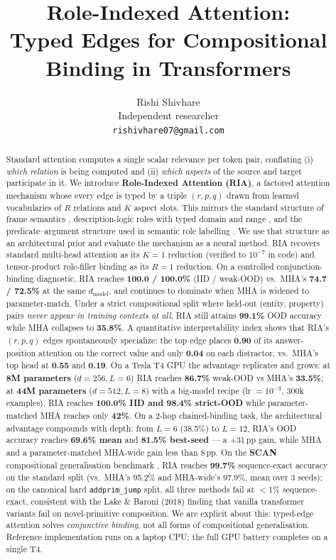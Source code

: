 \documentclass{article}
\title{Role-Indexed Attention:\\
Typed Edges for Compositional Binding in Transformers}
\author{%
  Rishi Shivhare\\
  Independent researcher\\
  \texttt{rishivhare07@gmail.com}
}
\date{}
\begin{document}
\maketitle

\begin{abstract}
Standard attention computes a single scalar relevance per token pair,
conflating (i) \emph{which relation} is being computed and (ii)
\emph{which aspects} of the source and target participate in it. We
introduce \textbf{Role-Indexed Attention (RIA)}, a factored attention
mechanism whose every edge is typed by a triple $(r, p, q)$ drawn
from learned vocabularies of $R$ relations and $K$ aspect slots. This
mirrors the standard structure of frame semantics
\citep{fillmore1976,baker1998framenet}, description-logic roles with
typed domain and range \citep{baader2003description}, and the
predicate--argument structure used in semantic role labelling
\citep{palmer2005propbank}. We use that structure as an architectural
prior and evaluate the mechanism as a neural method.
%
RIA recovers standard multi-head attention as its $K{=}1$ reduction
(verified to $10^{-7}$ in code) and tensor-product role-filler binding
as its $R{=}1$ reduction. On a controlled conjunction-binding
diagnostic, RIA reaches \textbf{100.0 / 100.0\%} (IID / weak-OOD)
vs.\ MHA's \textbf{74.7 / 72.5\%} at the same $d_{\text{model}}$, and
continues to dominate when MHA is widened to parameter-match.  Under a
strict compositional split where held-out (entity, property) pairs
\emph{never appear in training contexts at all}, RIA still attains
\textbf{99.1\%} OOD accuracy while MHA collapses to
\textbf{35.8\%}. A quantitative interpretability index
shows that RIA's $(r, p, q)$ edges spontaneously specialize: the top
edge places \textbf{0.90} of its answer-position attention on the
correct value and only \textbf{0.04} on each distractor, vs.\ MHA's
top head at \textbf{0.55} and \textbf{0.19}. On a Tesla T4 GPU the
advantage replicates and grows: at \textbf{8M parameters}
($d{=}256, L{=}6$) RIA reaches \textbf{86.7\%} weak-OOD vs MHA's
\textbf{33.5\%}; at \textbf{44M parameters} ($d{=}512, L{=}8$) with a
big-model recipe (lr $= 10^{-3}$, 300k examples), RIA reaches
\textbf{100.0\% IID and 98.4\% strict-OOD} while parameter-matched MHA
reaches only \textbf{42\%}. On a 2-hop chained-binding task,
the architectural advantage compounds with depth: from $L{=}6$
(38.5\%) to $L{=}12$, RIA's OOD accuracy reaches \textbf{69.6\% mean}
and \textbf{81.5\% best-seed} --- a +31\,pp gain, while MHA and a
parameter-matched MHA-wide gain less than 8\,pp. On the
\textbf{SCAN} compositional generalisation benchmark
\citep{lake2018scan}, RIA reaches \textbf{99.7\%} sequence-exact
accuracy on the standard split (vs.\ MHA's 95.2\% and MHA-wide's
97.9\%, mean over 3 seeds); on the canonical hard \texttt{addprim\_jump}
split, all three methods fail at $<$1\% sequence-exact, consistent
with the Lake \& Baroni (2018) finding that vanilla transformer
variants fail on novel-primitive composition. We are explicit about
this: typed-edge attention solves \emph{conjunctive binding}, not
all forms of compositional generalisation. Reference implementation
runs on a laptop CPU; the full GPU battery completes on a single T4.
\end{abstract}
\end{document}
